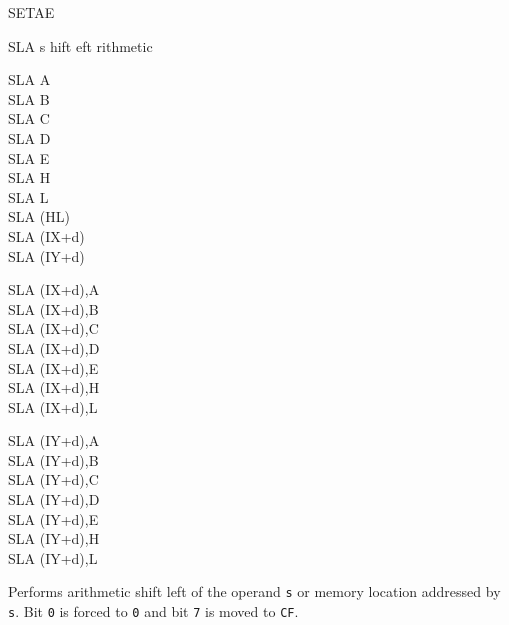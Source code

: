 \begin{basedescript}{
	\desclabelstyle{\multilinelabel}
	\desclabelwidth{3cm}}
\begin{DetailItem}{SETAE\ZXN}
		\begin{DetailEffects}
			\FlagsSETAE
		\end{DetailEffects}
						
		\begin{DetailTiming}
			\DetailTime{2}{8}
		\end{DetailTiming}

	\end{DetailItem}

	\pagebreak
	\begin{DetailItem}{SLA s}
		{hift eft rithmetic}
		{\SymSLA{s}}
		
		\begin{DetailVariants}
			SLA A\\
			SLA B\\
			SLA C\\
			SLA D\\
			SLA E\\
			SLA H\\
			SLA L\\
			SLA (HL)\\
			SLA (IX+d)\\
			SLA (IY+d)

			\columnbreak
			SLA (IX+d),A\UNDOC\\
			SLA (IX+d),B\UNDOC\\
			SLA (IX+d),C\UNDOC\\
			SLA (IX+d),D\UNDOC\\
			SLA (IX+d),E\UNDOC\\
			SLA (IX+d),H\UNDOC\\
			SLA (IX+d),L\UNDOC

			\columnbreak
			SLA (IY+d),A\UNDOC\\
			SLA (IY+d),B\UNDOC\\
			SLA (IY+d),C\UNDOC\\
			SLA (IY+d),D\UNDOC\\
			SLA (IY+d),E\UNDOC\\
			SLA (IY+d),H\UNDOC\\
			SLA (IY+d),L\UNDOC
		\end{DetailVariants}

		Performs arithmetic shift left of the operand {\tt s} or memory location addressed by {\tt s}. Bit {\tt 0} is forced to {\tt 0} and bit {\tt 7} is moved to {\tt CF}.

		\begin{DetailEffects}[p]
			\FlagsSLAr
		\end{DetailEffects}
						

\end{DetailItem}
\end{basedescript}
